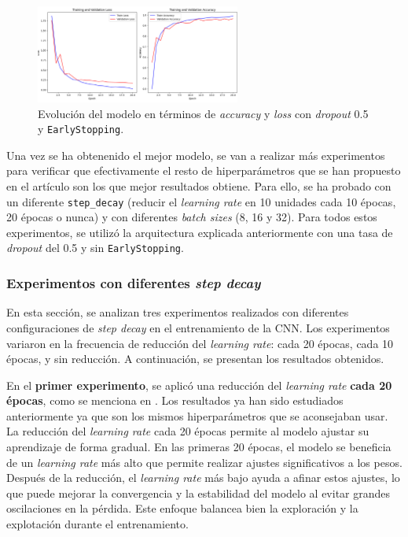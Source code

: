 \begin{figure}[H]
    \centering
    \includegraphics[width=0.6\textwidth]{img/modelo20MMC_CNN.png} 
    \caption{Evolución del modelo en términos de \textit{accuracy} y \textit{loss} con \textit{dropout} 0.5 y \lstinline|EarlyStopping|.}
    \label{fig:cnn50ES}
\end{figure}

Una vez se ha obtenenido el mejor modelo, se van a realizar más experimentos para verificar que efectivamente el resto de hiperparámetros que se han propuesto en el artículo \citep{kalash2018malware} son los que mejor resultados obtiene. Para ello,  se ha probado con un diferente \lstinline|step_decay| (reducir el \textit{learning rate} en 10 unidades cada 10 épocas, 20 épocas o nunca) y con diferentes\textit{ batch sizes} (8, 16 y 32). Para todos estos experimentos, se utilizó la arquitectura explicada anteriormente con una tasa de \textit{dropout} del 0.5 y sin \lstinline|EarlyStopping|.

\subsubsection{Experimentos con diferentes \textit{step decay}}

En esta sección, se analizan tres experimentos realizados con diferentes configuraciones de \textit{step decay} en el entrenamiento de la CNN. Los experimentos variaron en la frecuencia de reducción del \textit{learning rate}: cada 20 épocas, cada 10 épocas, y sin reducción. A continuación, se presentan los resultados obtenidos.


En el \textbf{primer experimento}, se aplicó una reducción del \textit{learning rate} \textbf{cada 20 épocas}, como se menciona en \citep{kalash2018malware}. Los resultados ya han sido estudiados anteriormente ya que son los mismos hiperparámetros que se aconsejaban usar. La reducción del \textit{learning rate} cada 20 épocas permite al modelo ajustar su aprendizaje de forma gradual. En las primeras 20 épocas, el modelo se beneficia de un \textit{learning rate} más alto que permite realizar ajustes significativos a los pesos. Después de la reducción, el \textit{learning rate} más bajo ayuda a afinar estos ajustes, lo que puede mejorar la convergencia y la estabilidad del modelo al evitar grandes oscilaciones en la pérdida. Este enfoque balancea bien la exploración y la explotación durante el entrenamiento.


